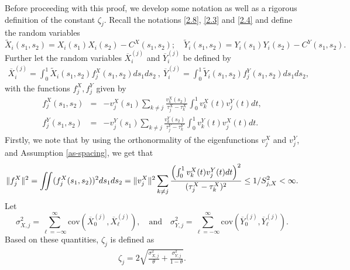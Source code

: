 \documentclass[11pt]{article}
\numberwithin{equation}{section}
\numberwithin{theorem}{section}
\numberwithin{lemma}{section}
\numberwithin{proposition}{section}
\numberwithin{cor}{section}
\numberwithin{definition}{section}
\numberwithin{cons}{section}
\numberwithin{rem}{section}
\numberwithin{exa}{section}
\numberwithin{table}{section}
\numberwithin{figure}{section}
\numberwithin{algo}{section}
\newcommand{\intt}{\int\hspace{-.2cm}\int}
\begin{document}
{{Before proceeding with this proof, we develop some notation as well as a rigorous definition of  the constant $\zeta_j$.  Recall  the notations \eqref{2.8}, \eqref{2.3} and \eqref{2.4} and define the random variables
\begin{equation}\label{2.15a}
 \tilde X_i (s_1, s_2) = X_i (s_1) X_i (s_2) - C^X (s_1, s_2); \quad \tilde Y_i (s_1, s_2) = Y_i(s_1) Y_i(s_2) - C^Y (s_1, s_2).
\end{equation}
Further let the random variables $\overline{X}_i^{(j)}$ and $\overline{Y}_i^{(j)}$ be defined by
\begin{eqnarray}
  \label{2.17}
  \overline {X}_i^{(j)} = \int^1_0 \tilde X_i (s_1, s_2) f^X_j (s_1, s_2) ds_1 ds_2 ~,~
  \overline{Y}_i^{(j)} =  \int^1_0 \tilde Y_i (s_1, s_2) f^Y_j (s_1, s_2) ds_1 ds_2,
\end{eqnarray}
with the functions $f^X_j, f^Y_j$  given by
\begin{eqnarray}
\label{2.19}
f^X_j (s_1,s_2) &=& - v^X_j (s_1)  \sum_{k \neq j} \frac {v^X_k (s_2)}{\tau^X_j - \tau^X_k} \int^1_0 v^X_k (t) v^Y_j (t) dt, \\ \label{2.20}
  f^Y_j (s_1, s_2) &=& - v^Y_j (s_1)   \sum_{k \neq j} \frac {v^Y_k (s_2)}{\tau^Y_j - \tau^Y_k} \int^1_0 v^Y_k (t) v^X_j (t) dt.
\end{eqnarray}
Firstly, we note that by using the orthonormality of the eigenfunctions $v_j^X$ and $v_j^Y$, and Assumption \ref{as-spacing}, we get that
$$
\|f^X_j\|^2=\intt (f^X_j (s_1,s_2))^2 ds_1ds_2  = \|v_j^X\|^2 \sum_{k\ne j} \frac { \left(\int^1_0 v^X_k (t) v^Y_j (t) dt \right)^2}{(\tau^X_j - \tau^X_k)^2}  \le 1/S_{j,X}^2 < \infty.
$$
Let
$$
\sigma_{X,j}^2 = \sum_{\ell = -\infty}^{\infty} \mbox{cov}(\overline{X}_0^{(j)},\overline{X}_\ell^{(j)}),
\mbox{~~
and ~~}
\sigma_{Y,j}^2 = \sum_{\ell = -\infty}^{\infty} \mbox{cov}(\overline{Y}_0^{(j)},\overline{Y}_\ell^{(j)}).
$$
Based on these quantities, $\zeta_j$  is defined as
\begin{align}\label{tau-def-app}
\zeta_j = 2 \sqrt{\frac{\sigma_{X,j}^2}{\theta} + \frac{\sigma_{Y,j}^2}{1-\theta}}.
\end{align}


}}
\end{document}
